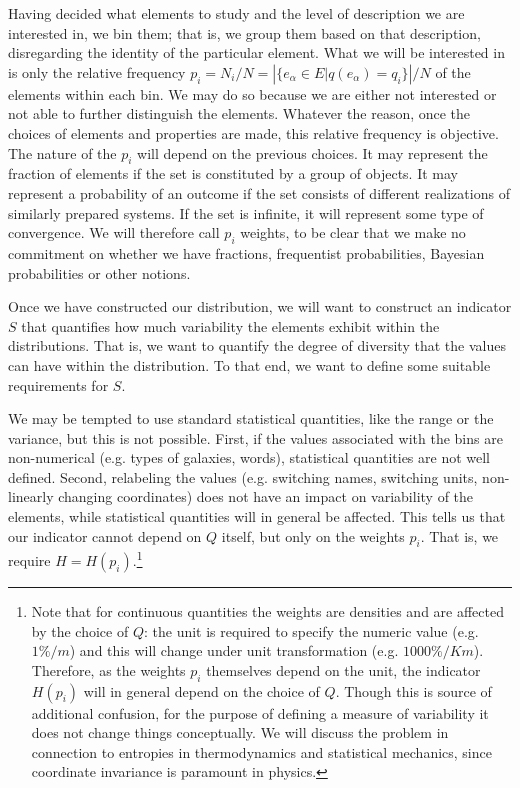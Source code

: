 \documentclass{article}
\begin{document}
Having decided what elements to study and the level of description we are interested in, we bin them; that is, we group them based on that description, disregarding the identity of the particular element. What we will be interested in is only the relative frequency $p_i = N_i / N = \left| \{e_\alpha \in E | q(e_\alpha) = q_i \} \right| / N$ of the elements within each bin. We may do so because we are either not interested or not able to further distinguish the elements. Whatever the reason, once the choices of elements and properties are made, this relative frequency is objective. The nature of the $p_i$ will depend on the previous choices. It may represent the fraction of elements if the set is constituted by a group of objects. It may represent a probability of an outcome if the set consists of different realizations of similarly prepared systems. If the set is infinite, it will represent some type of convergence. We will therefore call $p_i$ weights, to be clear that we make no commitment on whether we have fractions, frequentist probabilities, Bayesian probabilities or other notions.

Once we have constructed our distribution, we will want to construct an indicator $S$ that quantifies how much variability the elements exhibit within the distributions. That is, we want to quantify the degree of diversity that the values can have within the distribution. To that end, we want to define some suitable requirements for $S$.

We may be tempted to use standard statistical quantities, like the range or the variance, but this is not possible. First, if the values associated with the bins are non-numerical (e.g. types of galaxies, words), statistical quantities are not well defined. Second, relabeling the values (e.g. switching names, switching units, non-linearly changing coordinates) does not have an impact on variability of the elements, while statistical quantities will in general be affected. This tells us that our indicator cannot depend on $Q$ itself, but only on the weights $p_i$. That is, we require $H=H(p_i)$.\footnote{Note that for continuous quantities the weights are densities and are affected by the choice of $Q$: the unit is required to specify the numeric value (e.g. $1 \% / m$) and this will change under unit transformation (e.g. $1000 \% / Km$). Therefore, as the weights $p_i$ themselves depend on the unit, the indicator $H(p_i)$ will in general depend on the choice of $Q$. Though this is source of additional confusion, for the purpose of defining a measure of variability it does not change things conceptually. We will discuss the problem in connection to entropies in thermodynamics and statistical mechanics, since coordinate invariance is paramount in physics.}
\end{document}

